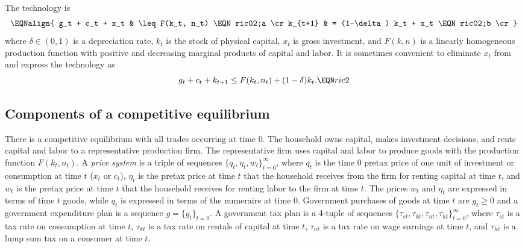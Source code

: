 The technology is
$$\EQNalign{ g_t + c_t + x_t &  \leq F(k_t, n_t) \EQN ric02;a \cr
   k_{t+1} & = (1-\delta) k_t + x_t \EQN ric02;b \cr }  $$
where $\delta \in (0,1)$ is a depreciation rate,  $k_t$ is the stock
of physical capital, $x_t$ is gross investment,
and $F(k,n)$ is a linearly homogeneous  production
function with positive and decreasing marginal products of capital and
labor.
It is sometimes convenient to eliminate $x_t$ from   and express
the technology as
$$ g_t + c_t + k_{t+1} \leq F(k_t, n_t) + (1-\delta) k_t. \EQN ric2 $$


\subsection{Components of a competitive equilibrium}
There is a competitive equilibrium with all trades occurring at
time $0$. The household owns  capital, makes investment decisions,
and rents capital and labor to a representative production firm.
The representative firm uses capital and labor to produce goods
with the production function $F(k_t, n_t)$. A {\it price system\/}
is a triple of sequences $\{q_t, \eta_t, w_t\}_{t=0}^\infty$, where
$q_t$ is the time $0$ pretax price of one unit of investment or
consumption at time $t$ ($x_t$ or $c_t$),  $\eta_t$ is the pretax
price at time $t$ that the household receives from the firm for
renting capital at time $t$, and $w_t$ is the pretax price at
time $t$ that the household receives for renting labor to the firm
at time $t$. The prices $w_t$ and $ \eta_t$ are  expressed in terms
 of
time $t$ goods, while $q_t$ is expressed in terms of the  numeraire at time $0$.
Government purchases of goods at time $t$ are $g_t \geq 0$ and a government expenditure
plan is a sequence $g = \{g_t\}_{t=0}$.  A government tax plan is a 4-tuple of sequences
$ \{\tau_{ct}, \tau_{kt}, \tau_{nt}, \tau_{ht} \}_{t=0}^\infty$,
where $\tau_{ct}$ is a tax rate  on consumption at time $t$, $\tau_{kt}$ is a tax rate on rentals of
capital at time $t$, $\tau_{nt}$ is a tax rate on wage earnings at time $t$, and $\tau_{ht}$ 
is a lump sum tax on a consumer at time $t$. 





